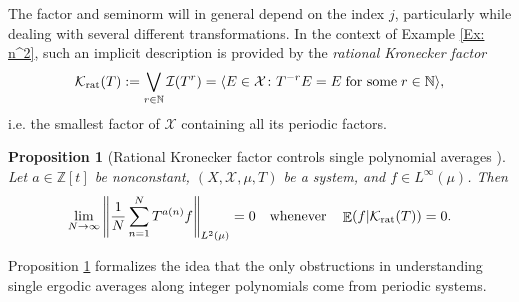 \documentclass[11pt]{amsart}
\newtheorem{proposition}[lemma]{Proposition}
\theoremstyle{definition}
\DeclareMathOperator*{\E}{\mathbb{E}}
\newcommand{\N}{{\mathbb N}}
\newcommand{\Z}{{\mathbb Z}}
\newcommand{\CI}{{\mathcal I}}
\newcommand{\CK}{{\mathcal K}}
\newcommand{\CX}{{\mathcal X}}
\newcommand{\norm}[1]{\left\Vert #1\right\Vert}
\newcommand{\1}{{\mathbf{1}}}
\newcommand{\Krat}{{\CK_{\text{\rm rat}}}}
\begin{document}
The factor and seminorm will in general depend on the index $j$, particularly while dealing with several different transformations. In the context of Example \ref{Ex: n^2}, such an implicit description is provided by the \emph{rational Kronecker factor}
\begin{align}\label{E: Krat}
	\Krat(T) := \bigvee_{r\in\N}\CI(T^r) = \langle E\in \CX\colon T^{-r}E = E\;\textrm{for some}\; r\in\N\rangle,
\end{align}
i.e. the smallest factor of $\CX$ containing all its periodic factors.
\begin{proposition}[Rational Kronecker factor controls single polynomial averages {\cite[Lemma 3.14]{Fu81}}]\label{P: Krat}
Let $a\in\Z[t]$ be nonconstant, $(X, \CX, \mu, T)$ be a system, and $f\in L^\infty(\mu)$. Then
\begin{align*}
\lim_{N\to\infty} \norm{\frac{1}{N}\sum_{n=1}^N T^{a(n)} f}_{L^2(\mu)} = 0\quad \textrm{whenever}\quad \E(f|\Krat(T)) = 0.
\end{align*}
\end{proposition}
Proposition \ref{P: Krat} formalizes the idea that the only obstructions in understanding single ergodic averages along integer polynomials come from periodic systems. 
\end{document}
